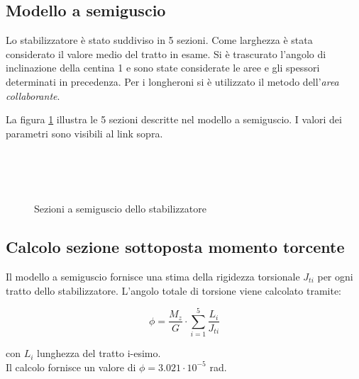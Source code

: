\documentclass[
10pt, %
a4paper, %
oneside, %
headinclude,footinclude, %
BCOR5mm, %
]{scrartcl}
\begin{document}
\subsection{Modello a semiguscio}

Lo stabilizzatore è stato suddiviso in 5 sezioni. Come larghezza è stata considerato il valore medio del tratto in esame. Si è trascurato l'angolo di inclinazione della centina 1 e sono state considerate le aree e gli spessori determinati in precedenza. Per i longheroni si è utilizzato il metodo dell'\emph{area collaborante}.

La figura \ref{fig:semiguscio} illustra le 5 sezioni descritte nel modello a semiguscio. I valori dei parametri sono visibili al link sopra.


\begin{figure}[tb]
	\centering
	 \quad
	 \\
	 \quad
	 \\
	 \\
	\caption[descrizione a semiguscio]{Sezioni a semiguscio dello stabilizzatore} %
	\label{fig:semiguscio}
\end{figure}


\subsection{Calcolo sezione sottoposta momento torcente}

Il modello a semiguscio fornisce una stima della rigidezza torsionale $J_{ti}$ per ogni tratto dello stabilizzatore. L'angolo totale di torsione viene calcolato tramite:

\begin{equation}
	\phi = \frac{M_z}{G} \cdot \sum_{i=1}^{5} \frac{L_i}{J_{ti}}
	\label{eq:sg_torque}
\end{equation}

con $L_i$ lunghezza del tratto i-esimo.\\
Il calcolo fornisce un valore di $\phi = 3.021 \cdot 10^{-5}$ rad.
\end{document}
